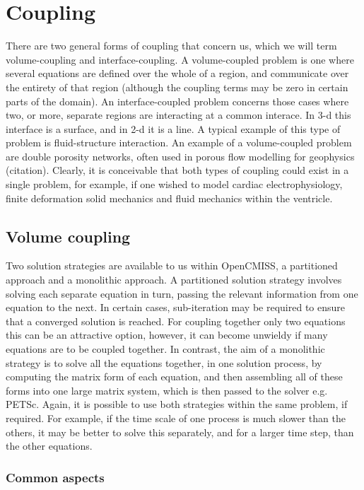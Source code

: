 \chapter{Coupling}
\label{cha:coupling}

There are two general forms of coupling that concern us, which we will term volume-coupling and interface-coupling. A volume-coupled problem is one where several equations are defined over the whole of a region, and communicate over the entirety of that region (although the coupling terms may be zero in certain parts of the domain). An interface-coupled problem concerns those cases where two, or more, separate regions are interacting at a common interace. In 3-d this interface is a surface, and in 2-d it is a line. A typical example of this type of problem is fluid-structure interaction. An example of a volume-coupled problem are double porosity networks, often used in porous flow modelling for geophysics (citation). Clearly, it is conceivable that both types of coupling could exist in a single problem, for example, if one wished to model cardiac electrophysiology, finite deformation solid mechanics and fluid mechanics within the ventricle.

\section{Volume coupling}

Two solution strategies are available to us within OpenCMISS, a partitioned approach and a monolithic approach. A partitioned solution strategy involves solving each separate equation in turn, passing the relevant information from one equation to the next. In certain cases, sub-iteration may be required to ensure that a converged solution is reached. For coupling together only two equations this can be an attractive option, however, it can become unwieldy if many equations are to be coupled together. In contrast, the aim of a monolithic strategy is to solve all the equations together, in one solution process, by computing the matrix form of each equation, and then assembling all of these forms into one large matrix system, which is then passed to the solver e.g. PETSc. Again, it is possible to use both strategies within the same problem, if required. For example, if the time scale of one process is much slower than the others, it may be better to solve this separately, and for a larger time step, than the other equations. 

\subsection{Common aspects}

